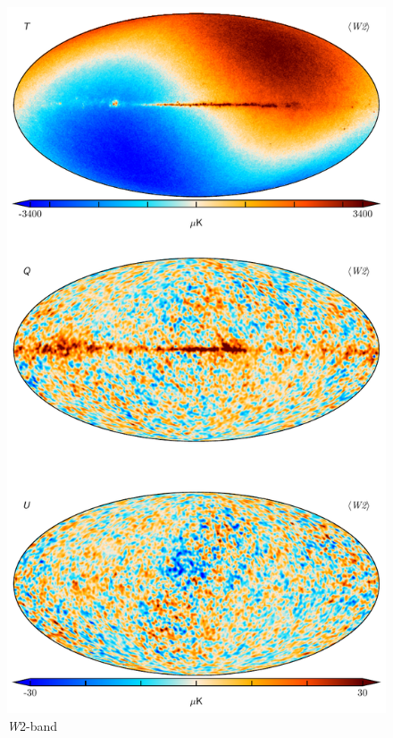 \documentclass[twocolumn]{../../common/aa}
\newcommand{\W}[0]{\textit W}
\begin{document}
\begin{figure}
	\centering
	\includegraphics[height=0.9\textheight]{figures/090-WMAP_W2_map.pdf}
	\caption{\W2-band}
\end{figure}
\end{document}
